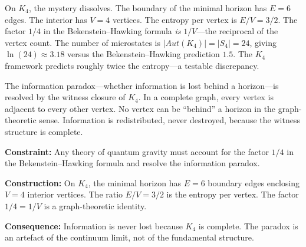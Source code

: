 \documentclass[11pt,a4paper]{book}
\def\mathrm#1{#1}%
\begin{document}
On $K_4$, the mystery dissolves.  The boundary of the minimal horizon has
$E = 6$ edges.  The interior has $V = 4$ vertices.  The entropy per vertex
is $E / V = 3/2$.  The factor $1/4$ in the Bekenstein--Hawking formula
\emph{is} $1/V$---the reciprocal of the vertex count.  The number of
microstates is $|\mathrm{Aut}(K_4)| = |S_4| = 24$, giving
$\ln(24) \approx 3.18$ versus the Bekenstein--Hawking prediction $1.5$.
The $K_4$ framework predicts roughly twice the entropy---a testable
discrepancy.

The information paradox---whether information is lost behind a horizon---is
resolved by the witness closure of $K_4$.  In a complete graph, every
vertex is adjacent to every other vertex.  No vertex can be ``behind'' a
horizon in the graph-theoretic sense.  Information is redistributed, never
destroyed, because the witness structure is complete.

\textbf{Constraint:}
Any theory of quantum gravity must account for the factor $1/4$ in the
Bekenstein--Hawking formula and resolve the information paradox.

\textbf{Construction:}
On $K_4$, the minimal horizon has $E = 6$ boundary edges enclosing
$V = 4$ interior vertices.  The ratio $E/V = 3/2$ is the entropy per
vertex.  The factor $1/4 = 1/V$ is a graph-theoretic identity.

\textbf{Consequence:}
Information is never lost because $K_4$ is complete.  The paradox is an
artefact of the continuum limit, not of the fundamental structure.
\end{document}
